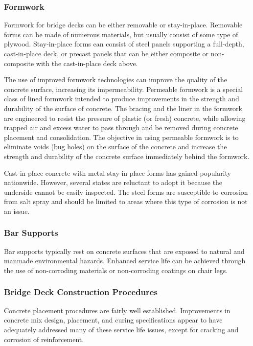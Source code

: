 \subsubsection{Formwork}
Formwork for bridge decks can be either removable or stay-in-place. Removable forms can be made of numerous
materials, but usually consist of some type of plywood. Stay-in-place forms can consist of steel panels supporting a
full-depth, cast-in-place deck, or precast panels that can be either composite or non-composite with the cast-in-place
deck above.

The use of improved formwork technologies can improve the quality of the concrete surface, increasing its
impermeability. Permeable formwork is a special class of lined formwork intended to produce improvements in the
strength and durability of the surface of concrete. The bracing and the liner in the formwork are engineered to resist
the pressure of plastic (or fresh) concrete, while allowing trapped air and excess water to pass through and be
removed during concrete placement and consolidation. The objective in using permeable formwork is to eliminate
voids (bug holes) on the surface of the concrete and increase the strength and durability of the concrete surface
immediately behind the formwork.

Cast-in-place concrete with metal stay-in-place forms has gained popularity nationwide. However, several states
are reluctant to adopt it because the underside cannot be easily inspected. The steel forms are susceptible to corrosion
from salt spray and should be limited to areas where this type of corrosion is not an issue.


\subsubsection{Bar Supports}
Bar supports typically rest on concrete surfaces that are exposed to natural and manmade environmental hazards.
Enhanced service life can be achieved through the use of non-corroding materials or non-corroding coatings on chair
legs.


\subsubsection{Bridge Deck Construction Procedures}
Concrete placement procedures are fairly well established. Improvements in concrete mix design, placement, and
curing specifications appear to have adequately addressed many of these service life issues, except for cracking and
corrosion of reinforcement.

